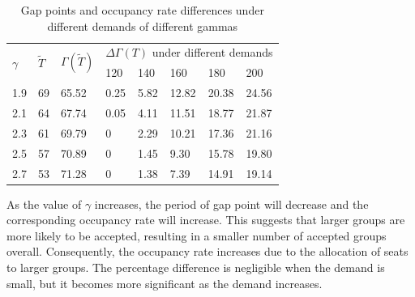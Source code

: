 \begin{table}[ht]
  \centering
  \caption{Gap points and occupancy rate differences under different demands of different gammas}
\begin{tabular}{llllllll}
  \hline
  \multicolumn{1}{|l|}{\multirow{2}{*}{$\gamma$}} & \multicolumn{1}{l|}{\multirow{2}{*}{$\tilde{T}$}} & \multicolumn{1}{l|}{\multirow{2}{*}{$\Gamma(\tilde{T})$}} & \multicolumn{5}{l|}{$\Delta \Gamma(T)$ under different demands}   \\ 
  \cline{4-8} 
  \multicolumn{1}{|l|}{}  & \multicolumn{1}{l|}{} & \multicolumn{1}{l|}{} & \multicolumn{1}{l|}{120} & \multicolumn{1}{l|}{140} & \multicolumn{1}{l|}{160} & \multicolumn{1}{l|}{180} & \multicolumn{1}{l|}{200} \\ 
  \hline
  \multicolumn{1}{|l|}{1.9}  & \multicolumn{1}{l|}{69} & \multicolumn{1}{l|}{65.52}  & \multicolumn{1}{l|}{0.25}  & \multicolumn{1}{l|}{5.82}  & \multicolumn{1}{l|}{12.82} & \multicolumn{1}{l|}{20.38} & \multicolumn{1}{l|}{24.56} \\
  \hline                                    
  \multicolumn{1}{|l|}{2.1}  & \multicolumn{1}{l|}{64} & \multicolumn{1}{l|}{67.74} & \multicolumn{1}{l|}{0.05}  & \multicolumn{1}{l|}{4.11}  & \multicolumn{1}{l|}{11.51} & \multicolumn{1}{l|}{18.77} & \multicolumn{1}{l|}{21.87} \\ 
  \hline           
  \multicolumn{1}{|l|}{2.3}  & \multicolumn{1}{l|}{61} & \multicolumn{1}{l|}{69.79}  & \multicolumn{1}{l|}{0}  & \multicolumn{1}{l|}{2.29}  & \multicolumn{1}{l|}{10.21} & \multicolumn{1}{l|}{17.36} & \multicolumn{1}{l|}{21.16} \\ 
  \hline           
  \multicolumn{1}{|l|}{2.5}  & \multicolumn{1}{l|}{57} & \multicolumn{1}{l|}{70.89} & \multicolumn{1}{l|}{0}  & \multicolumn{1}{l|}{1.45}  & \multicolumn{1}{l|}{9.30} & \multicolumn{1}{l|}{15.78} & \multicolumn{1}{l|}{19.80} \\ 
  \hline          
  \multicolumn{1}{|l|}{2.7}  & \multicolumn{1}{l|}{53} & \multicolumn{1}{l|}{71.28}  & \multicolumn{1}{l|}{0}  & \multicolumn{1}{l|}{1.38}  & \multicolumn{1}{l|}{7.39} & \multicolumn{1}{l|}{14.91} & \multicolumn{1}{l|}{19.14} \\ 
  \hline            
\end{tabular}
\end{table}

As the value of $\gamma$ increases, the period of gap point will decrease and the corresponding occupancy rate will increase. This suggests that larger groups are more likely to be accepted, resulting in a smaller number of accepted groups overall. Consequently, the occupancy rate increases due to the allocation of seats to larger groups. The percentage difference is negligible when the demand is small, but it becomes more significant as the demand increases.

